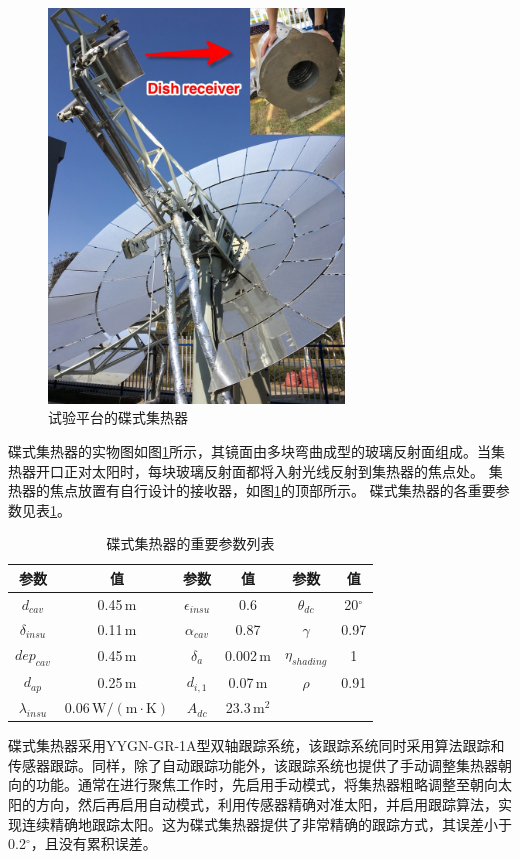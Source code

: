 \begin{figure}[!ht]
\centering
\includegraphics[width=0.7\textwidth]{fig/DishCollector.jpg}
\caption{试验平台的碟式集热器}
\label{fig:DishCollector}
\end{figure}
碟式集热器的实物图如图\ref{fig:DishCollector}所示，其镜面由多块弯曲成型的玻璃反射面组成。当集热器开口正对太阳时，每块玻璃反射面都将入射光线反射到集热器的焦点处。
集热器的焦点放置有自行设计的接收器，如图\ref{fig:DishCollector}的顶部所示。
碟式集热器的各重要参数见表\ref{tab:ddc}。
\begin{table}[htbp]
	\caption{碟式集热器的重要参数列表}
	\begin{center}
	\begin{tabular}{cccccc}
		\toprule
		参数		&	值	&	参数		&	值	&	参数		&	值\\
		\midrule
		$d_{cav}$	&	0.45$\,\mathrm{m}$	&	$\epsilon_{insu}$	&	0.6	&	$\theta_{dc}$	&	20$^\circ$\\
		$\delta_{insu}$	&	0.11$\,\mathrm{m}$	&	$\alpha_{cav}$	&	0.87	&	$\gamma$	&	0.97\\
		$dep_{cav}$	&	0.45$\,\mathrm{m}$	&	$\delta_a$		&	0.002$\,\mathrm{m}$	&	$\eta_{shading}$	&	1\\
		$d_{ap}$	&	0.25$\,\mathrm{m}$	&	$d_{i,1}$	&	0.07$\,\mathrm{m}$	&	$\rho$	&	0.91\\
		$\lambda_{insu}$	&	0.06$\,\mathrm{W/(m\cdot K)}$	&	$A_{dc}$	&	23.3$\,\mathrm{m^2}$	&	\\		
		\bottomrule
	\end{tabular}
	\end{center}
	\label{tab:ddc}
\end{table}
碟式集热器采用YYGN-GR-1A型双轴跟踪系统，该跟踪系统同时采用算法跟踪和传感器跟踪。同样，除了自动跟踪功能外，该跟踪系统也提供了手动调整集热器朝向的功能。通常在进行聚焦工作时，先启用手动模式，将集热器粗略调整至朝向太阳的方向，然后再启用自动模式，利用传感器精确对准太阳，并启用跟踪算法，实现连续精确地跟踪太阳。这为碟式集热器提供了非常精确的跟踪方式，其误差小于0.2$^\circ$，且没有累积误差。

